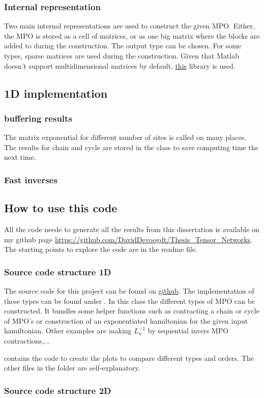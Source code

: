 \subsubsection{Internal representation}

Two main internal representations are used to construct the given MPO. Either, the MPO is stored as a cell of matrices, or as one big matrix where the blocks are added to during the construction. The output type can be chosen. For some types, sparse matrices are used during the construction. Given that Matlab doesn't support multidimensional matrices by default, \href{https://nl.mathworks.com/matlabcentral/fileexchange/29832-n-dimensional-sparse-arrays}{this} library is used.

\subsection{1D implementation}

\subsubsection{buffering results}

The matrix exponential for different number of sites is called on many places. The results for chain and cycle are stored in the class to save computing time the next time.

\subsubsection{Fast inverses}

\subsection{How to use this code}

All the code neede to generate all the results from this dissertation is available on my github page \url{https://github.com/DavidDevoogdt/Thesis_Tensor_Networks}. The starting points to explore the code are in the readme file.

\subsubsection{Source code structure 1D}

The source code for this project can be found on \href{https://github.com/DavidDevoogdt/Thesis_Tensor_Networks}{github}. The implementation of these types can be found under . In this class the different types of MPO can be constructed. It bundles some helper functions such as contracting a chain or cycle of MPO's or construction of an exponentiated hamiltonian for the given input hamiltonian. Other examples are making $L_n^{-1}$ by sequential invers MPO contractions,...

  contains the code to create the plots to compare different types and orders. The other files in the folder are self-explanatory.

\subsubsection{Source code structure 2D}

